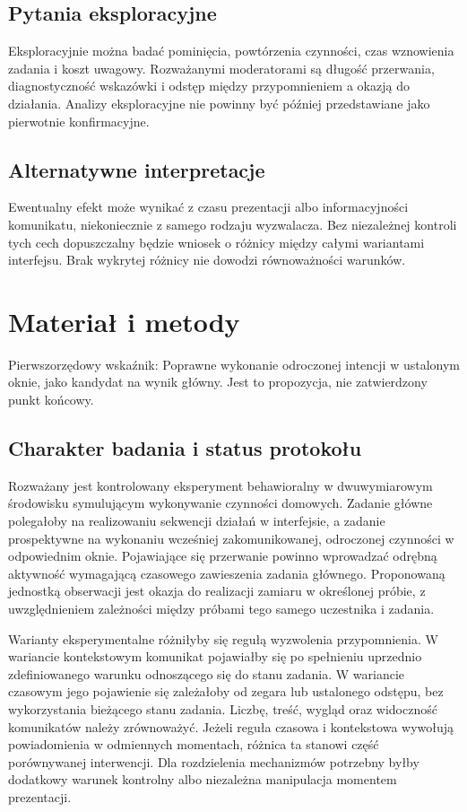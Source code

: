 \documentclass[11pt,a4paper]{article}
\begin{document}
\subsection{Pytania eksploracyjne}
Eksploracyjnie można badać pominięcia, powtórzenia czynności, czas wznowienia zadania i koszt uwagowy. Rozważanymi moderatorami są długość przerwania, diagnostyczność wskazówki i odstęp między przypomnieniem a okazją do działania. Analizy eksploracyjne nie powinny być później przedstawiane jako pierwotnie konfirmacyjne.

\subsection{Alternatywne interpretacje}
Ewentualny efekt może wynikać z czasu prezentacji albo informacyjności komunikatu, niekoniecznie z samego rodzaju wyzwalacza. Bez niezależnej kontroli tych cech dopuszczalny będzie wniosek o różnicy między całymi wariantami interfejsu. Brak wykrytej różnicy nie dowodzi równoważności warunków.

\section{Materiał i metody}

Pierwszorzędowy wskaźnik: Poprawne wykonanie odroczonej intencji w ustalonym oknie, jako kandydat na wynik główny. Jest to propozycja, nie zatwierdzony punkt końcowy.

\subsection{Charakter badania i status protokołu}
Rozważany jest kontrolowany eksperyment behawioralny w dwuwymiarowym środowisku symulującym wykonywanie czynności domowych. Zadanie główne polegałoby na realizowaniu sekwencji działań w interfejsie, a zadanie prospektywne na wykonaniu wcześniej zakomunikowanej, odroczonej czynności w odpowiednim oknie. Pojawiające się przerwanie powinno wprowadzać odrębną aktywność wymagającą czasowego zawieszenia zadania głównego. Proponowaną jednostką obserwacji jest okazja do realizacji zamiaru w określonej próbie, z uwzględnieniem zależności między próbami tego samego uczestnika i zadania.

Warianty eksperymentalne różniłyby się regułą wyzwolenia przypomnienia. W wariancie kontekstowym komunikat pojawiałby się po spełnieniu uprzednio zdefiniowanego warunku odnoszącego się do stanu zadania. W wariancie czasowym jego pojawienie się zależałoby od zegara lub ustalonego odstępu, bez wykorzystania bieżącego stanu zadania. Liczbę, treść, wygląd oraz widoczność komunikatów należy zrównoważyć. Jeżeli reguła czasowa i kontekstowa wywołują powiadomienia w odmiennych momentach, różnica ta stanowi część porównywanej interwencji. Dla rozdzielenia mechanizmów potrzebny byłby dodatkowy warunek kontrolny albo niezależna manipulacja momentem prezentacji.
\end{document}
